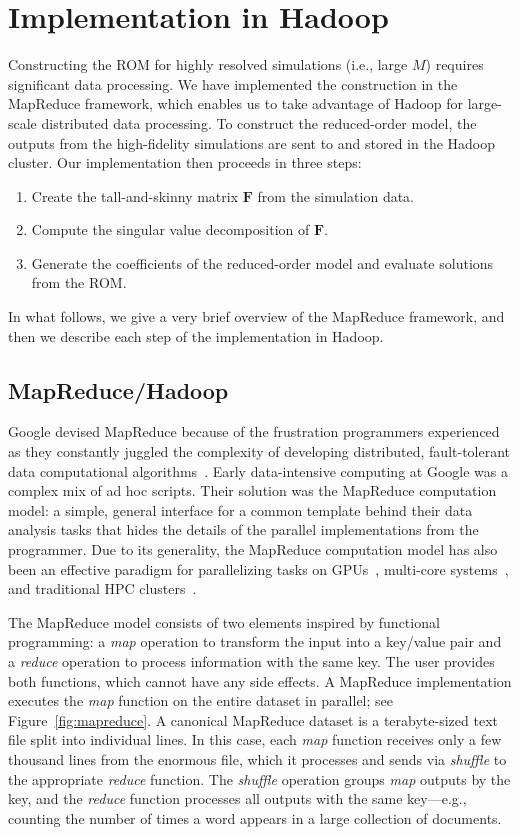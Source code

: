 \documentclass[final]{siamltex}
\providecommand{\mat}[1]{\boldsymbol{#1}}
\providecommand{\mF}{\ensuremath{\mat{F}}}
\begin{document}
\section{Implementation in Hadoop}
\label{sec:implement}
Constructing the ROM for highly resolved simulations (i.e., large $M$)
requires significant data processing. We have implemented the
construction in the MapReduce framework, which enables us to take
advantage of Hadoop for large-scale distributed data processing.  To
construct the reduced-order model, the outputs from the high-fidelity
simulations are sent to and stored in the Hadoop cluster. Our
implementation then proceeds in three steps:
\begin{enumerate}
\item Create the tall-and-skinny matrix $\mF$ from the simulation data.
\item Compute the singular value decomposition of $\mF$.
\item Generate the coefficients of the reduced-order model and evaluate
  solutions from the ROM.
\end{enumerate}
In what follows, we give a very brief overview of the MapReduce
framework, and then we describe each step of the implementation in
Hadoop.

\subsection{MapReduce/Hadoop}
Google devised MapReduce because of the frustration programmers
experienced as they constantly juggled the complexity of developing
distributed, fault-tolerant data computational
algorithms~\cite{Dean2004-MapReduce}. Early data-intensive computing
at Google was a complex mix of ad hoc scripts. Their solution was the
MapReduce computation model: a simple, general interface for a common
template behind their data analysis tasks that hides the details of
the parallel implementations from the programmer.  Due to its
generality, the MapReduce computation model has also been an effective
paradigm for parallelizing tasks on GPUs~\cite{He-2008-MARS},
multi-core systems~\cite{Talbot-2011-pheonix++}, and traditional HPC
clusters~\cite{Plimpton-2011-MRMPI}.

The MapReduce model consists of two elements inspired by functional
programming: a {\textit{map}\xspace} operation to transform the input into a key/value
pair and a {\textit{reduce}\xspace} operation to process information with the same
key. The user provides both functions, which cannot have any side
effects. A MapReduce implementation executes the {\textit{map}\xspace} function on the
entire dataset in parallel; see Figure~\ref{fig:mapreduce}. A
canonical MapReduce dataset is a terabyte-sized text file split into
individual lines. In this case, each {\textit{map}\xspace} function receives only a few
thousand lines from the enormous file, which it processes and sends
via {\textit{shuffle}\xspace} to the appropriate {\textit{reduce}\xspace} function. The {\textit{shuffle}\xspace}
operation groups {\textit{map}\xspace} outputs by the key, and the {\textit{reduce}\xspace} function
processes all outputs with the same key---e.g., counting the number of
times a word appears in a large collection of documents.
\end{document}
